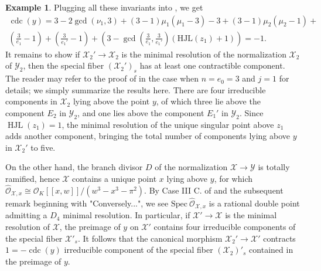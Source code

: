 \documentclass[12pt]{amsart}
\numberwithin{equation}{section}
\theoremstyle{definition}
\newtheorem{example}[equation]{Example}
\newcommand{\mc}[1]{\mathcal{#1}}
\renewcommand{\O}{\mathcal{O}}
\newcommand{\Spec}{\mathrm{Spec} \ }
\newcommand{\X}{\mathcal{X}}
\newcommand{\Y}{\mathcal{Y}}
\newcommand{\tx}[1]{\text{#1}}
\DeclareMathOperator{\cdc}{cdc}
\DeclareMathOperator{\HJL}{HJL}
\begin{document}
\begin{example}
    
    Plugging all these invariants into , we get 
    \begin{multline*} \cdc(y)=3-2\gcd(\nu_1,3)+(3-1)\mu_1(\mu_1-3)-3+(3-1)\mu_2(\mu_2-1)+\\
    \left(\frac{3}{e_1}-1 \right)+\left(\frac{3}{e_1'}-1 \right)+\left(3-\gcd \left(\frac{3}{e_1},\frac{3}{e_1'} \right)(\tx{HJL}(z_1)+1) \right) = -1. \end{multline*}
    It remains to show if $\mc{X}_2' \rightarrow \mc{X}_2$ is the minimal resolution of the normalization $\mc{X}_2$ of $\mc{Y}_2$, then the special fiber $(\X_2')_s$ has at least one contractible component. The reader may refer to the proof of \cite[Proposition 6.1]{Part2} in the case when $n=e_0=3$ and $j=1$ for details; we simply summarize the results here. There are four irreducible components in $\mc{X}_2$ lying above the point $y$, of which three lie above the component $E_2$ in $\mc{Y}_2$, and one lies above the component $E_1'$ in $\mc{Y}_2$. Since $\HJL(z_1) = 1$, the minimal resolution of the unique singular point above $z_1$ adds another component, bringing the total number of components lying above $y$ in $\mc{X}_2'$ to five. 
     
     On the other hand, the branch divisor $D$ of the normalization $\X\to\Y$ is totally ramified, hence $\X$ contains a unique point $x$ lying above $y$, for which $\hat{\O}_{\X,x}\cong \O_K[[x,w]]/(w^3-x^3-\pi^2)$. By Case III C. of \cite[Section 24]{Lip69} and the subsequent remark beginning with "Conversely...", we see $\Spec \hat{\O}_{\X,x}$ is a rational double point admitting a $D_4$ minimal resolution. In particular, if $\X'\to\X$ is the minimal resolution of $\X$, the preimage of $y$ on $\X'$ contains four irreducible components of the special fiber $\X'_s$. It follows that the canonical morphism $\mc{X}_2'\to\mc{X}'$ contracts $1=-\cdc(y)$ irreducible component of the special fiber $(\X_2)'_s$ contained in the preimage of $y$.    
\end{example}
    
\end{document}
